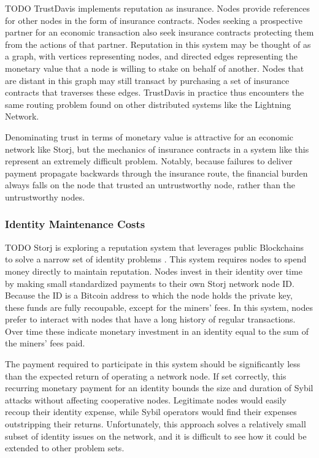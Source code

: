 \documentclass[a4paper,10pt]{article}
\newcommand{\todo}[1]{{\color{red} TODO #1}}
\begin{document}
\todo{
TrustDavis \cite{22} implements reputation as insurance. Nodes provide
references for other nodes in the form of insurance contracts. Nodes seeking a
prospective partner for an economic transaction also seek insurance contracts
protecting them from the actions of that partner. Reputation in this system may
be thought of as a graph, with vertices representing nodes, and directed edges
representing the monetary value that a node is willing to stake on behalf of
another. Nodes that are distant in this graph may still transact by purchasing a
set of insurance contracts that traverses these edges. TrustDavis in practice
thus encounters the same routing problem found on other distributed systems like
the Lightning Network.

Denominating trust in terms of monetary value is attractive for an economic
network like Storj, but the mechanics of insurance contracts in a system like
this represent an extremely difficult problem. Notably, because failures to
deliver payment propagate backwards through the insurance route, the financial
burden always falls on the node that trusted an untrustworthy node, rather than
the untrustworthy nodes.
}

\subsubsection{Identity Maintenance Costs}

\todo{
Storj is exploring a reputation system that leverages public Blockchains to
solve a narrow set of identity problems \cite{23}. This system requires nodes to
spend money directly to maintain reputation. Nodes invest in their identity over
time by making small standardized payments to their own Storj network node ID.
Because the ID is a Bitcoin address to which the node holds the private key,
these funds are fully recoupable, except for the miners’ fees. In this system,
nodes prefer to interact with nodes that have a long history of regular
transactions. Over time these indicate monetary investment in an identity equal
to the sum of the miners’ fees paid.

The payment required to participate in this system should be significantly less
than the expected return of operating a network node. If set correctly, this
recurring monetary payment for an identity bounds the size and duration of Sybil
attacks without affecting cooperative nodes. Legitimate nodes would easily
recoup their identity expense, while Sybil operators would find their expenses
outstripping their returns. Unfortunately, this approach solves a relatively
small subset of identity issues on the network, and it is difficult to see how
it could be extended to other problem sets.
}
\end{document}
